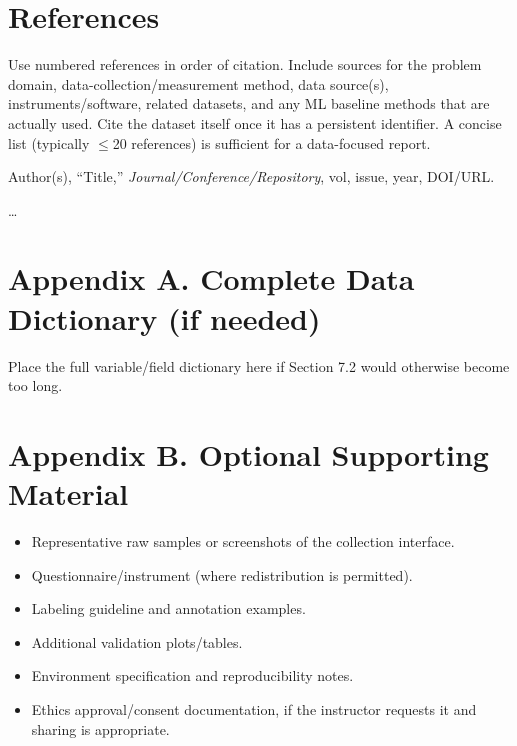 \documentclass[11pt,a4paper]{article}
\begin{document}
\vspace{1.5em}

\section{References}
Use numbered references in order of citation. Include sources for the problem domain, data-collection/measurement method, data source(s), instruments/software, related datasets, and any ML baseline methods that are actually used. Cite the dataset itself once it has a persistent identifier. A concise list (typically $\le$20 references) is sufficient for a data-focused report.

\begin{enumerate}[label={[\arabic*]}, leftmargin=2em]
    \item Author(s), ``Title,'' \textit{Journal/Conference/Repository}, vol, issue, year, DOI/URL.
    \item \dots
\end{enumerate}

\vspace{1.5em}

\section*{Appendix A. Complete Data Dictionary (if needed)}
Place the full variable/field dictionary here if Section 7.2 would otherwise become too long.

\section*{Appendix B. Optional Supporting Material}
\begin{itemize}[leftmargin=1.5em, itemsep=2pt, topsep=2pt]
    \item Representative raw samples or screenshots of the collection interface.
    \item Questionnaire/instrument (where redistribution is permitted).
    \item Labeling guideline and annotation examples.
    \item Additional validation plots/tables.
    \item Environment specification and reproducibility notes.
    \item Ethics approval/consent documentation, if the instructor requests it and sharing is appropriate.
\end{itemize}
\end{document}
